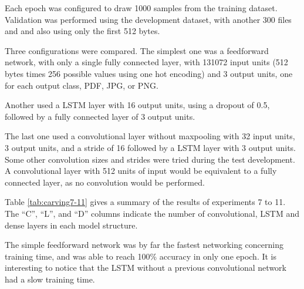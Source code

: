 Each epoch was configured to draw 1000 samples from the training dataset. Validation was performed using the development dataset, with another 300 files and and also using only the first 512 bytes.



Three configurations were compared. The simplest one was a feedforward network, with only a single fully connected layer, with 131072 input units (512 bytes times 256 possible values using one hot encoding) and 3 output units, one for each output class, PDF, JPG, or PNG.

Another used a LSTM layer with 16 output units, using a dropout of 0.5, followed by a fully connected layer of 3 output units.

The last one used a convolutional layer without maxpooling with 32 input units, 3 output units, and a stride of 16 followed by a LSTM layer with 3 output units. Some other convolution sizes and strides were tried during the test development. A convolutional layer with 512 units of input would be equivalent to a fully connected layer, as no convolution would be performed.

Table \ref{tab:carving7-11} gives a summary of the results of experiments 7 to 11. The ``C'', ``L'', and ``D'' columns indicate the number of convolutional, LSTM and dense layers in each model structure.


The simple feedforward network was by far the fastest networking concerning training time, and was able to reach 100\% accuracy in only one epoch. It is interesting to notice that the LSTM without a previous convolutional network had a slow training time.





% 


